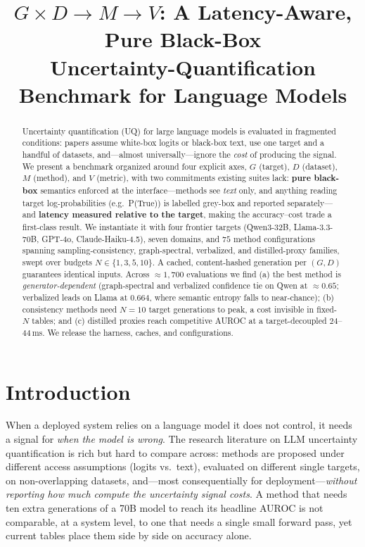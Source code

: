 \documentclass[11pt]{article}
\title{$G\times D\to M\to V$: A Latency-Aware, Pure Black-Box \\
Uncertainty-Quantification Benchmark for Language Models}
\begin{document}
\maketitle

\begin{abstract}
Uncertainty quantification (UQ) for large language models is evaluated in fragmented
conditions: papers assume white-box logits or black-box text, use one target and a handful of
datasets, and---almost universally---ignore the \emph{cost} of producing the signal. We present a
benchmark organized around four explicit axes, $G$ (target), $D$ (dataset), $M$ (method), and
$V$ (metric), with two commitments existing suites lack: \textbf{pure black-box} semantics
enforced at the interface---methods see \emph{text} only, and anything reading target
log-probabilities (e.g.\ P(True)) is labelled grey-box and reported separately---and
\textbf{latency measured relative to the target}, making the accuracy--cost trade a first-class
result. We instantiate it with four frontier targets (Qwen3-32B, Llama-3.3-70B, GPT-4o,
Claude-Haiku-4.5), seven domains, and $75$ method configurations spanning sampling-consistency,
graph-spectral, verbalized, and distilled-proxy families, swept over budgets
$N\in\{1,3,5,10\}$. A cached, content-hashed generation per $(G,D)$ guarantees identical inputs.
Across ${\approx}1{,}700$ evaluations we find (a) the best method is \emph{generator-dependent}
(graph-spectral and verbalized confidence tie on Qwen at ${\approx}0.65$; verbalized leads on
Llama at $0.664$, where semantic entropy falls to near-chance); (b) consistency methods need
$N{=}10$ target generations to peak, a cost invisible in fixed-$N$ tables; and (c) distilled
proxies reach competitive AUROC at a target-decoupled $24$--$44$\,ms. We release the harness,
caches, and configurations.
\end{abstract}

\section{Introduction}
When a deployed system relies on a language model it does not control, it needs a signal
for \emph{when the model is wrong}. The research literature on LLM uncertainty
quantification is rich but hard to compare across: methods are proposed under different
access assumptions (logits vs.\ text), evaluated on different single targets, on
non-overlapping datasets, and---most consequentially for deployment---\emph{without
reporting how much compute the uncertainty signal costs}. A method that needs ten extra
generations of a 70B model to reach its headline AUROC is not comparable, at a system
level, to one that needs a single small forward pass, yet current tables place them side
by side on accuracy alone.
\end{document}
